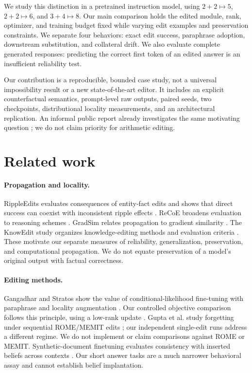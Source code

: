 \documentclass[10pt,twocolumn]{article}
\begin{document}
We study this distinction in a pretrained instruction model, using $2+2\mapsto5$, $2+2\mapsto6$, and $3+4\mapsto8$. Our main comparison holds the edited module, rank, optimizer, and training budget fixed while varying edit examples and preservation constraints. We separate four behaviors: exact edit success, paraphrase adoption, downstream substitution, and collateral drift. We also evaluate complete generated responses: predicting the correct first token of an edited answer is an insufficient reliability test.

Our contribution is a reproducible, bounded case study, not a universal impossibility result or a new state-of-the-art editor. It includes an explicit counterfactual semantics, prompt-level raw outputs, paired seeds, two checkpoints, distributional locality measurements, and an architectural replication. An informal public report already investigates the same motivating question \citep{informal}; we do not claim priority for arithmetic editing.

\section{Related work}
\paragraph{Propagation and locality.}
RippleEdits evaluates consequences of entity-fact edits and shows that direct success can coexist with inconsistent ripple effects \citep{cohen2024ripple}. ReCoE broadens evaluation to reasoning schemes \citep{hua2024recoe}. GradSim relates propagation to gradient similarity \citep{qin2024grad}. The KnowEdit study organizes knowledge-editing methods and evaluation criteria \citep{zhang2024survey}. These motivate our separate measures of reliability, generalization, preservation, and computational propagation. We do not equate preservation of a model's original output with factual correctness.

\paragraph{Editing methods.}
Gangadhar and Stratos show the value of conditional-likelihood fine-tuning with paraphrase and locality augmentation \citep{gangadhar2024ft}. Our controlled objective comparison follows this principle, using a low-rank update \citep{hu2021lora}. Gupta et al. study forgetting under sequential ROME/MEMIT edits \citep{gupta2024forget}; our independent single-edit runs address a different regime. We do not implement or claim comparisons against ROME or MEMIT. Synthetic-document finetuning evaluates consistency with inserted beliefs across contexts \citep{anthropic2025}. Our short answer tasks are a much narrower behavioral assay and cannot establish belief implantation.
\end{document}
